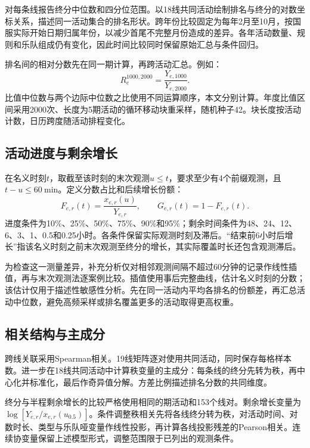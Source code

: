 \documentclass[preprint,12pt]{elsarticle}
\begin{document}
对每条线报告终分中位数和四分位范围。以18线共同活动绘制排名与终分的对数坐标关系，描述同一活动集合的排名形状。跨年份比较固定为每年2月至10月，按国服实际开始日期归属年份，以减少首尾不完整月份造成的差异。各年活动数量、规则和乐队组成仍有变化，因此时间比较同时保留原始汇总与条件回归。

排名间的相对分数先在同一期计算，再跨活动汇总。例如：
\begin{equation}\label{eq:ratio}
R_e^{1000,2000}=\frac{Y_{e,1000}}{Y_{e,2000}}.
\end{equation}
比值中位数与两个边际中位数之比使用不同运算顺序，本文分别计算。年度比值区间采用2000次、长度为5期活动的循环移动块重采样，随机种子42\citep{kunsch1989}。块长度按活动计数，日历跨度随活动排程变化。

\subsection{活动进度与剩余增长}

在名义时刻\(t\)，取截至该时刻的末次观测\(u\leq t\)，要求至少有4个前缀观测，且\(t-u\leq60\ \mathrm{min}\)。定义分数占比和后续增长份额：
\begin{equation}\label{eq:growth}
F_{e,r}(t)=\frac{x_{e,r}(u)}{Y_{e,r}},\qquad
G_{e,r}(t)=1-F_{e,r}(t).
\end{equation}
进度条件为10\%、25\%、50\%、75\%、90\%和95\%；剩余时间条件为48、24、12、6、3、1、0.5和0.25小时。各条件保留实际观测时刻及滞后。“结束前6小时后增长”指该名义时刻之前末次观测至终分的增长，其实际覆盖时长还包含观测滞后。

为检查这一测量差异，补充分析仅对相邻观测间隔不超过60分钟的记录作线性插值，再与末次观测法逐案例比较。插值使用事后完整曲线，估计名义时刻的分数；该估计仅用于描述性敏感性分析。先在同一活动内平均各排名的份额差，再汇总活动中位数，避免高频采样或排名覆盖更多的活动取得更高权重。

\subsection{相关结构与主成分}

跨线关联采用Spearman相关\citep{spearman1904}。19线矩阵逐对使用共同活动，同时保存每格样本数。进一步在18线共同活动中计算秩变量的主成分：每条线的终分先转为秩，再中心化并标准化，最后作奇异值分解\citep{jolliffe2016}。方差比例描述排名分数的共同维度。

终分与半程剩余增长的比较严格使用相同的\NumCorrelationEvents{}期活动和153个线对。剩余增长变量为\(\log[Y_{e,r}/x_{e,r}(u_{0.5})]\)。条件调整秩相关先将各线终分转为秩，对活动时间、对数时长、类型与乐队哑变量作线性投影，再计算各线投影残差的Pearson相关。连续协变量保留上述模型形式，调整范围限于已列出的观测条件。
\end{document}
